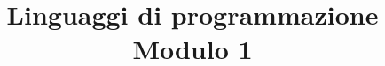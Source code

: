 
\title{\LARGE \textbf{Linguaggi di programmazione\\ \normalsize Modulo 1}}

\maketitle
{}
\tableofcontents








